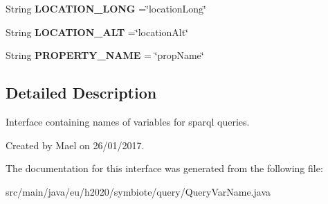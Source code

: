 \begin{DoxyCompactItemize}
\item 
String {\bfseries L\+O\+C\+A\+T\+I\+O\+N\+\_\+\+L\+O\+NG} =\char`\"{}location\+Long\char`\"{}\hypertarget{interfaceeu_1_1h2020_1_1symbiote_1_1query_1_1QueryVarName_a9f0f3487fd806547c8ea38e502b12654}{}\label{interfaceeu_1_1h2020_1_1symbiote_1_1query_1_1QueryVarName_a9f0f3487fd806547c8ea38e502b12654}

\item 
String {\bfseries L\+O\+C\+A\+T\+I\+O\+N\+\_\+\+A\+LT} =\char`\"{}location\+Alt\char`\"{}\hypertarget{interfaceeu_1_1h2020_1_1symbiote_1_1query_1_1QueryVarName_a2b86fadad7b5bceafab8f5313fd57b03}{}\label{interfaceeu_1_1h2020_1_1symbiote_1_1query_1_1QueryVarName_a2b86fadad7b5bceafab8f5313fd57b03}

\item 
String {\bfseries P\+R\+O\+P\+E\+R\+T\+Y\+\_\+\+N\+A\+ME} = \char`\"{}prop\+Name\char`\"{}\hypertarget{interfaceeu_1_1h2020_1_1symbiote_1_1query_1_1QueryVarName_a61963f7669296c7a272ae0df86f0db5e}{}\label{interfaceeu_1_1h2020_1_1symbiote_1_1query_1_1QueryVarName_a61963f7669296c7a272ae0df86f0db5e}

\end{DoxyCompactItemize}


\subsection{Detailed Description}
Interface containing names of variables for sparql queries.

Created by Mael on 26/01/2017. 

The documentation for this interface was generated from the following file\+:\begin{DoxyCompactItemize}
\item 
src/main/java/eu/h2020/symbiote/query/Query\+Var\+Name.\+java\end{DoxyCompactItemize}
